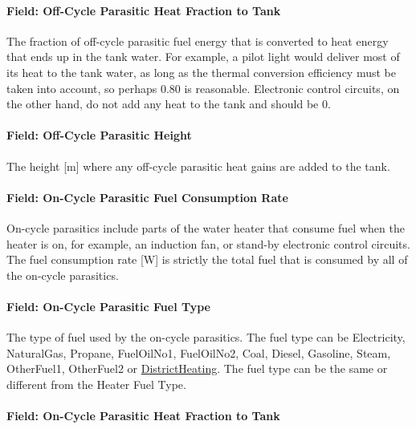\paragraph{Field: Off-Cycle Parasitic Heat Fraction to Tank}\label{field-off-cycle-parasitic-heat-fraction-to-tank-1}

The fraction of off-cycle parasitic fuel energy that is converted to heat energy that ends up in the tank water. For example, a pilot light would deliver most of its heat to the tank water, as long as the thermal conversion efficiency must be taken into account, so perhaps 0.80 is reasonable. Electronic control circuits, on the other hand, do not add any heat to the tank and should be 0.

\paragraph{Field: Off-Cycle Parasitic Height}\label{field-off-cycle-parasitic-height}

The height {[}m{]} where any off-cycle parasitic heat gains are added to the tank.

\paragraph{Field: On-Cycle Parasitic Fuel Consumption Rate}\label{field-on-cycle-parasitic-fuel-consumption-rate-1}

On-cycle parasitics include parts of the water heater that consume fuel when the heater is on, for example, an induction fan, or stand-by electronic control circuits. The fuel consumption rate {[}W{]} is strictly the total fuel that is consumed by all of the on-cycle parasitics.

\paragraph{Field: On-Cycle Parasitic Fuel Type}\label{field-on-cycle-parasitic-fuel-type-1}

The type of fuel used by the on-cycle parasitics. The fuel type can be Electricity, NaturalGas, Propane, FuelOilNo1, FuelOilNo2, Coal, Diesel, Gasoline, Steam, OtherFuel1, OtherFuel2 or \hyperref[districtheating]{DistrictHeating}. The fuel type can be the same or different from the Heater Fuel Type.

\paragraph{Field: On-Cycle Parasitic Heat Fraction to Tank}\label{field-on-cycle-parasitic-heat-fraction-to-tank-1}

